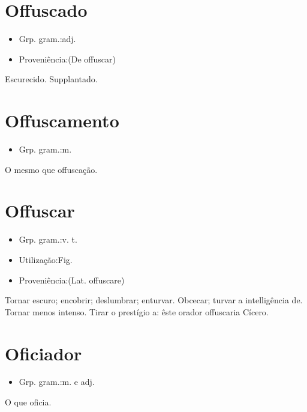 \section{Offuscado}
\begin{itemize}
\item {Grp. gram.:adj.}
\end{itemize}
\begin{itemize}
\item {Proveniência:(De \textunderscore offuscar\textunderscore )}
\end{itemize}
Escurecido.
Supplantado.
\section{Offuscamento}
\begin{itemize}
\item {Grp. gram.:m.}
\end{itemize}
O mesmo que \textunderscore offuscação\textunderscore .
\section{Offuscar}
\begin{itemize}
\item {Grp. gram.:v. t.}
\end{itemize}
\begin{itemize}
\item {Utilização:Fig.}
\end{itemize}
\begin{itemize}
\item {Proveniência:(Lat. \textunderscore offuscare\textunderscore )}
\end{itemize}
Tornar escuro; encobrir; deslumbrar; enturvar.
Obcecar; turvar a intelligência de.
Tornar menos intenso.
Tirar o prestígio a: \textunderscore êste orador offuscaria Cícero\textunderscore .
\section{Oficiador}
\begin{itemize}
\item {Grp. gram.:m.  e  adj.}
\end{itemize}
O que oficia.
